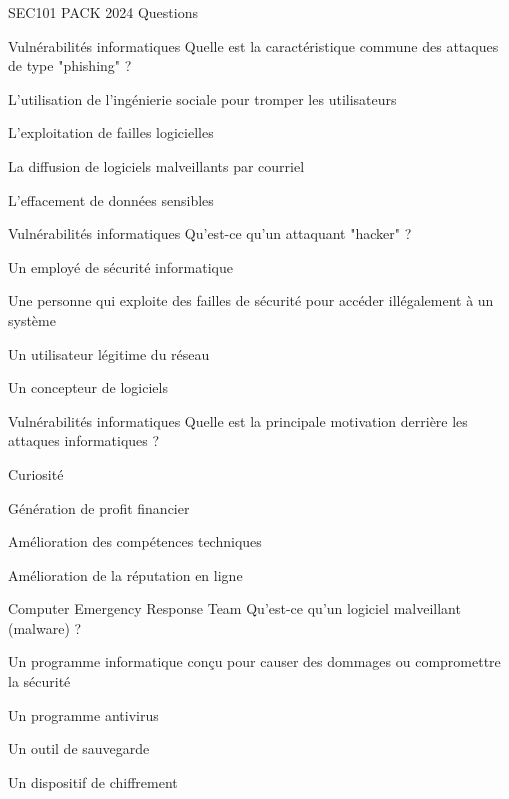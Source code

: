 \documentclass[12pt]{article}
\begin{document}
\begin{quiz}{SEC101 PACK 2024 Questions}
     \begin{multi}[points=1]{Vulnérabilités informatiques}
     Quelle est la caractéristique commune des attaques de type "phishing" ?
        \item *L'utilisation de l'ingénierie sociale pour tromper les utilisateurs
        \item L'exploitation de failles logicielles
        \item La diffusion de logiciels malveillants par courriel
        \item L'effacement de données sensibles
      \end{multi} 
    
     \begin{multi}[points=1]{Vulnérabilités informatiques}
     Qu'est-ce qu'un attaquant "hacker" ?
        \item Un employé de sécurité informatique
        \item *Une personne qui exploite des failles de sécurité pour accéder illégalement à un système
        \item Un utilisateur légitime du réseau
        \item Un concepteur de logiciels
      \end{multi} 
    
     \begin{multi}[points=1]{Vulnérabilités informatiques}
     Quelle est la principale motivation derrière les attaques informatiques ?
        \item Curiosité
        \item *Génération de profit financier
        \item Amélioration des compétences techniques
        \item Amélioration de la réputation en ligne
      \end{multi} 
    
     \begin{multi}[points=1]{Computer Emergency Response Team}
    Qu'est-ce qu'un logiciel malveillant (malware) ?
        \item *Un programme informatique conçu pour causer des dommages ou compromettre la sécurité
        \item Un programme antivirus
        \item Un outil de sauvegarde
        \item Un dispositif de chiffrement
      \end{multi} 
    

\end{quiz}
\end{document}
